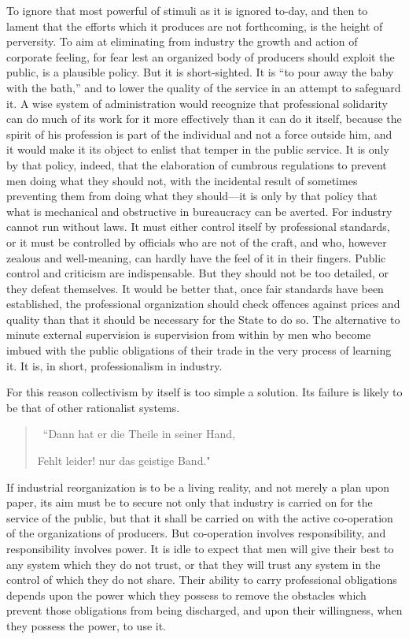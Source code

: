 \documentclass{book}
\begin{document}
To ignore that most powerful of stimuli as it is ignored to-day, and then to lament that the efforts which it produces are not forthcoming, is the height of perversity. To aim at eliminating from industry the growth and action of corporate feeling, for fear lest an organized body of producers should exploit the public, is a plausible policy. But it is short-sighted. It is “to pour away the baby with the bath,” and to lower the quality of the service in an attempt to safeguard it. A wise system of administration would recognize that professional solidarity can do much of its work for it more effectively than it can do it itself, because the spirit of his profession is part of the individual and not a force outside him, and it would make it its object to enlist that temper in the public service. It is only by that policy, indeed, that the elaboration of cumbrous regulations to prevent men doing what they should not, with the incidental result of sometimes preventing them from doing what they should—it is only by that policy that what is mechanical and obstructive in bureaucracy can be averted. For industry cannot run without laws. It must either control itself by professional standards, or it must be controlled by officials who are not of the craft, and who, however zealous and well-meaning, can hardly have the feel of it in their fingers. Public control and criticism are indispensable. But they should not be too detailed, or they defeat themselves. It would be better that, once fair standards have been established, the professional organization should check offences against prices and quality than that it should be necessary for the State to do so. The alternative to minute external supervision is supervision from within by men who become imbued with the public obligations of their trade in the very process of learning it. It is, in short, professionalism in industry.

For this reason collectivism by itself is too simple a solution. Its failure is likely to be that of other rationalist systems.

\begin{quotation}\
	“Dann hat er die Theile in seiner Hand,

	Fehlt leider! nur das geistige Band."
\end{quotation}

If industrial reorganization is to be a living reality, and not merely a plan upon paper, its aim must be to secure not only that industry is carried on for the service of the public, but that it shall be carried on with the active co-operation of the organizations of producers. But co-operation involves responsibility, and responsibility involves power. It is idle to expect that men will give their best to any system which they do not trust, or that they will trust any system in the control of which they do not share. Their ability to carry professional obligations depends upon the power which they possess to remove the obstacles which prevent those obligations from being discharged, and upon their willingness, when they possess the power, to use it.
\end{document}
